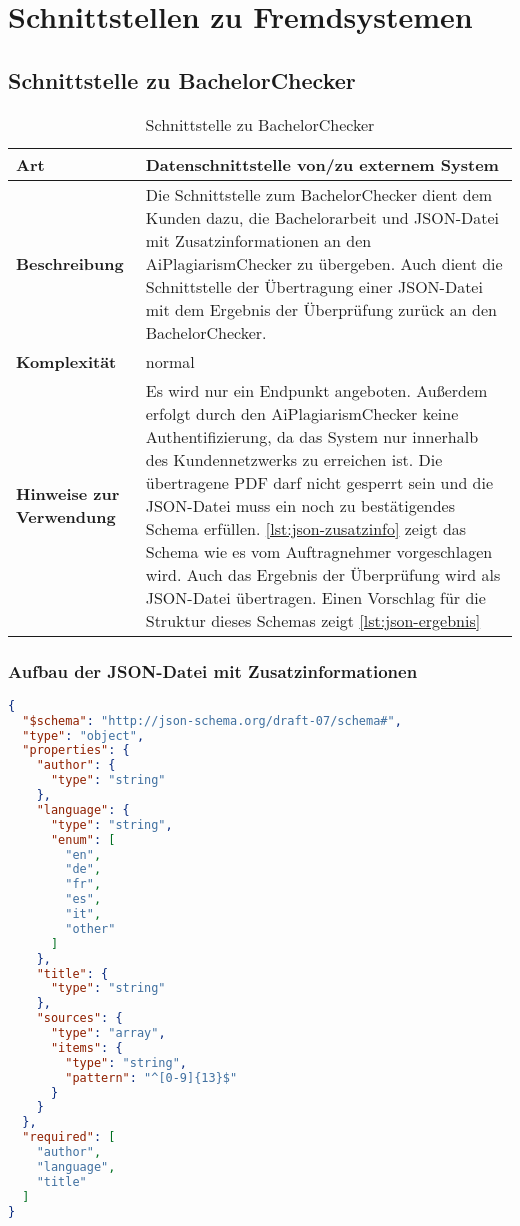\chapter{Schnittstellen zu Fremdsystemen}\label{ch:schnittstellen}


\section{Schnittstelle zu BachelorChecker}\label{sec:schnittstelle-bachelorchecker}

\begin{table}[H]
    \label{tab:schnittstelle-bachelorchecker}
    \begin{tabularx}{\textwidth}{|l|X|}
        \hline
        \textbf{Art}         & Datenschnittstelle von/zu externem System \\
        \hline
        \textbf{Beschreibung} & Die Schnittstelle zum BachelorChecker dient dem Kunden dazu, die Bachelorarbeit und JSON-Datei mit Zusatzinformationen an den AiPlagiarismChecker zu übergeben.
        Auch dient die Schnittstelle der Übertragung einer JSON-Datei mit dem Ergebnis der Überprüfung zurück an den BachelorChecker. \\
        \hline
        \textbf{Komplexität} & normal                                    \\
        \hline
        \textbf{Hinweise zur Verwendung} & Es wird nur ein Endpunkt angeboten.
        Außerdem erfolgt durch den AiPlagiarismChecker keine Authentifizierung, da das System nur innerhalb des Kundennetzwerks zu erreichen ist.
        Die übertragene PDF darf nicht gesperrt sein und die JSON-Datei muss ein noch zu bestätigendes Schema erfüllen.
        \autoref{lst:json-zusatzinfo} zeigt das Schema wie es vom Auftragnehmer vorgeschlagen wird.
        Auch das Ergebnis der Überprüfung wird als JSON-Datei übertragen.
        Einen Vorschlag für die Struktur dieses Schemas zeigt \autoref{lst:json-ergebnis} \\
        \hline
    \end{tabularx}
    \caption {Schnittstelle zu BachelorChecker}
\end{table}

\subsection{Aufbau der JSON-Datei mit Zusatzinformationen}\label{subsec:json-zusatzinfo}
\begin{lstlisting}[caption={JSON-Datei mit Zusatzinformationen},captionpos=b,label={lst:json-zusatzinfo}, language=json]
{
  "$schema": "http://json-schema.org/draft-07/schema#",
  "type": "object",
  "properties": {
    "author": {
      "type": "string"
    },
    "language": {
      "type": "string",
      "enum": [
        "en",
        "de",
        "fr",
        "es",
        "it",
        "other"
      ]
    },
    "title": {
      "type": "string"
    },
    "sources": {
      "type": "array",
      "items": {
        "type": "string",
        "pattern": "^[0-9]{13}$"
      }
    }
  },
  "required": [
    "author",
    "language",
    "title"
  ]
}
\end{lstlisting}

